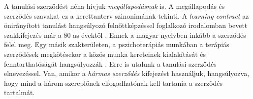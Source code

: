 A tanulási szerződést néha hívjuk \emph{megállapodásnak} is. A megállapodás és
szerződés szavakat ez a kerettanterv szinonimának tekinti. A \emph{learn\-ing
      con\-tract} az önirányított tanulást hangsúlyozó felnőttképzéssel
foglalkozó
irodalomban
bevett szakkifejezés már a 80-as évektől \citep{Malcolm77}. Ennek a magyar
nyelvben inkább a szerződés felel meg. Egy másik szakterületen, a
pszichoterápiás munkában a terápiás szerződések megkötésekor a közös munka
kereteinek kialakítását és fenntarthatóságát hangsúlyozzák
\citep{pszichoterapia}. Erre is utalunk a tanulási szerződés elnevezéssel. Van,
amikor a \emph{hármas szerződés} kifejezést használjuk, hangsúlyozva, hogy mind
a három szereplőnek elfogadhatónak kell tartania a szerződés tartalmát.
